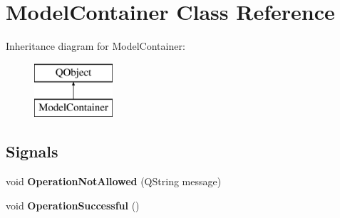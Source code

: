 \hypertarget{class_model_container}{}\section{Model\+Container Class Reference}
\label{class_model_container}
Inheritance diagram for Model\+Container\+:\begin{figure}[H]
\begin{center}
\leavevmode
\includegraphics[height=2.000000cm]{class_model_container}
\end{center}
\end{figure}
\subsection*{Signals}
\begin{DoxyCompactItemize}
\item 
\hypertarget{class_model_container_a313ffe5493b9ed80d7a525f8530ff5f5}{}void {\bfseries Operation\+Not\+Allowed} (Q\+String message)\label{class_model_container_a313ffe5493b9ed80d7a525f8530ff5f5}

\item 
\hypertarget{class_model_container_af965a24540959f575f98f154269fafd6}{}void {\bfseries Operation\+Successful} ()\label{class_model_container_af965a24540959f575f98f154269fafd6}

\end{DoxyCompactItemize}
